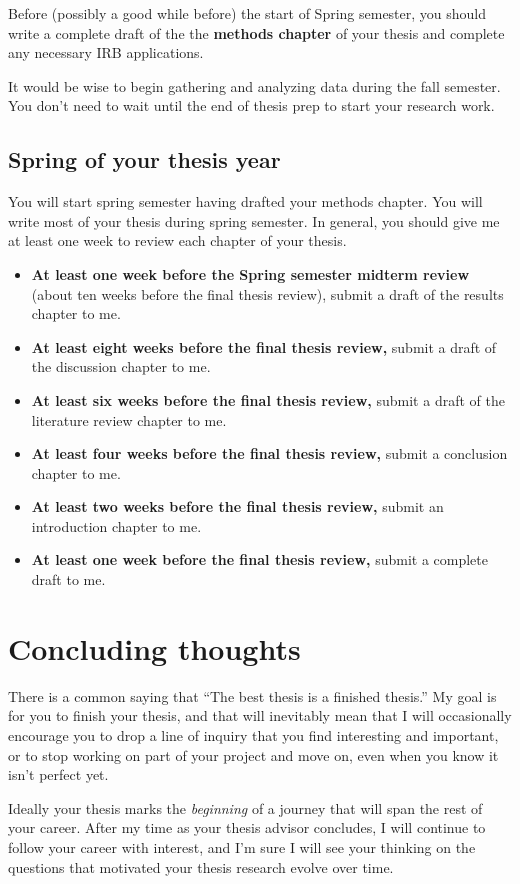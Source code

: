 \documentclass[]{tufte-book}
\begin{document}
Before (possibly a good while before) the start of Spring semester, you should write a complete draft of the the \textbf{methods chapter} of your thesis and complete any necessary IRB applications.

It would be wise to begin gathering and analyzing data during the fall semester. You don't need to wait until the end of thesis prep to start your research work.

\hypertarget{spring-of-your-thesis-year}{%
\section{Spring of your thesis year}\label{spring-of-your-thesis-year}}

You will start spring semester having drafted your methods chapter. You will write most of your thesis during spring semester. In general, you should give me at least one week to review each chapter of your thesis.

\begin{itemize}
\item
  \textbf{At least one week before the Spring semester midterm review} (about ten weeks before the final thesis review), submit a draft of the results chapter to me.
\item
  \textbf{At least eight weeks before the final thesis review,} submit a draft of the discussion chapter to me.
\item
  \textbf{At least six weeks before the final thesis review,} submit a draft of the literature review chapter to me.
\item
  \textbf{At least four weeks before the final thesis review,} submit a conclusion chapter to me.
\item
  \textbf{At least two weeks before the final thesis review,} submit an introduction chapter to me.
\item
  \textbf{At least one week before the final thesis review,} submit a complete draft to me.
\end{itemize}

\hypertarget{concluding-thoughts}{%
\chapter{Concluding thoughts}\label{concluding-thoughts}}

There is a common saying that ``The best thesis is a finished thesis.'' My goal is for you to finish your thesis, and that will inevitably mean that I will occasionally encourage you to drop a line of inquiry that you find interesting and important, or to stop working on part of your project and move on, even when you know it isn't perfect yet.

Ideally your thesis marks the \emph{beginning} of a journey that will span the rest of your career. After my time as your thesis advisor concludes, I will continue to follow your career with interest, and I'm sure I will see your thinking on the questions that motivated your thesis research evolve over time.


\end{document}
